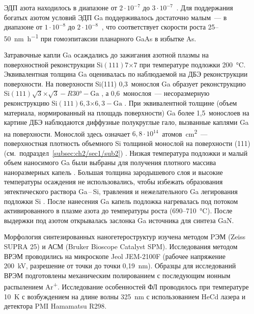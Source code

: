 ЭДП азота находилось в диапазоне от \(2 \cdot 10^{-7}\) до \(3 \cdot
10^{-7}\)~\si{\torr}. Для поддержания богатых азотом условий ЭДП Ga
поддерживалось достаточно малым~--- в диапазоне от \(1 \cdot 10^{-8}\) до \(2
\cdot 10^{-8}\)~\si{\torr}, что соответствует скорости роста
25--50~\si{\nano\meter\per\hour} при гомоэпитаксии планарного GaAs в избытке
As.

Затравочные капли Ga осаждались до зажигания азотной плазмы на поверхностной
реконструкции Si\((111)7\)\(\times\)\(7\) при температуре подложки
200~\si{\degreeCelsius}. Эквивалентная толщина Ga оценивалась по наблюдаемой на
ДБЭ реконструкции поверхности. На поверхности Si(111) 0,3~монослоя Ga образует
реконструкцию Si\((111)\sqrt{3}\)\(\times\)\(\sqrt{3} - R30\si{\degree} -
\text{Ga}\) \cite{Kawazu1988}, а 0,6~монослоя~--- несоразмерную реконструкцию
Si\((111)6,3\)\(\times\)\(6,3 - \text{Ga}\) \cite{Cechal2007}. При
эквивалентной толщине (объем материала, нормированный на площадь поверхности)
Ga более 1,5~монослоев на картине ДБЭ наблюдаются диффузные полукруглые гало,
вызванные каплями Ga на поверхности. Монослой здесь означает \(6,8 \cdot
10^{14}\)~атомов\si{\per\centi\meter^{2}}~--- поверхностная плотность объемного
Si толщиной монослой на поверхности (111)
(см.~подраздел~\cref{subsec:ch2/sec1/sub2}) \cite{Kumar2010}. Низкая
температура подложки и малый объем наносимого Ga были выбраны для получения
плотного массива наноразмерных капель \cite{Ristic2008}. Большая толщина
зародышевого слоя и высокие температуры осаждения не использовались, чтобы
избежать образования эвтектического раствора Ga\,--\,Si, травления и
нежелательного Ga легирования подложки Si \cite{Yamane2009, Dadgar2015}. После
нанесения Ga капель подложка нагревалась под потоком активированного в плазме
азота до температуры роста (690--710~\si{\degreeCelsius}). После выдержки под
азотом открывалась заслонка Ga источника для синтеза GaN.

Морфология синтезированных наногетероструктур изучена методом PЭМ (Zeiss SUPRA
25) и АСМ (Bruker Bioscope Catalyst SPM). Исследования методом ВРЭМ проводились
на микроскопе Jeol JEM-2100F (рабочее напряжение 200~\si{\kilo\volt},
разрешение от точки до точки 0,19~\si{\nano\meter}). Образцы для исследований
ВРЭМ подготовлены механическим полированием с последующим ионным распылением
Ar\textsuperscript{+}. Исследование особенностей ФЛ проводилось при температуре
10~\si{\kelvin} с возбуждением на длине волны 325~\si{\nano\meter} с
использованием HeCd лазера и детектора PMI Hamamatsu R298.

